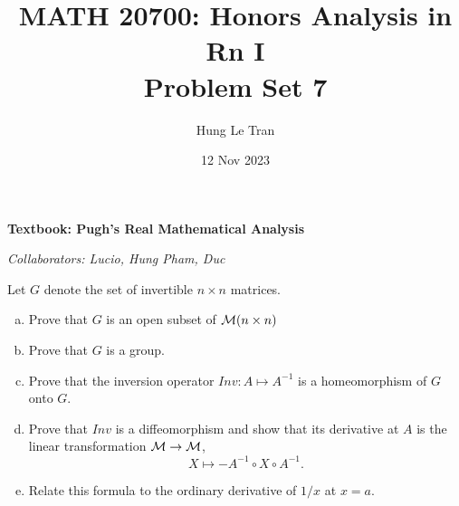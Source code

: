\documentclass[a4paper, 12pt]{article}
\title{MATH 20700: Honors Analysis in Rn I \\ \large Problem Set 7}
\date{12 Nov 2023}
\author{Hung Le Tran}
\begin{document}
\maketitle
\setcounter{section}{7}
\textbf{Textbook: Pugh's Real Mathematical Analysis}

\textit{Collaborators: Lucio, Hung Pham, Duc}

\begin{problem} 
Let $G$ denote the set of invertible $n \times n$ matrices.
\begin{enumerate} [(a)]
    \item Prove that $G$ is an open subset of $\mathcal{M}(n \times n)$
    \item Prove that $G$ is a group.
    \item Prove that the inversion operator $Inv: A \mapsto A^{-1}$ is a homeomorphism of $G$ onto $G$.
    \item Prove that $Inv$ is a diffeomorphism and show that its derivative at $A$ is the linear transformation $\mathcal{M} \to \mathcal{M}$, \[
              X \mapsto -A^{-1} \circ X \circ A^{-1}.
          \]
    \item Relate this formula to the ordinary derivative of $1/x$ at $x = a$.
\end{enumerate}
\end{problem}
\end{document}
